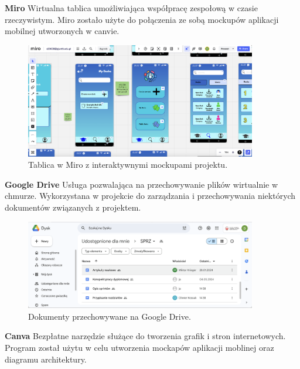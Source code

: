 \textbf{Miro} Wirtualna tablica umożliwiająca współpracę zespołową w czasie rzeczywistym. Miro zostało użyte do połączenia ze sobą mockupów aplikacji mobilnej utworzonych w canvie.

\begin{figure}[H]
    \centering
    \includegraphics[width=0.9\textwidth]{chapters/chapter_7/miro}
    \caption{Tablica w Miro z interaktywnymi mockupami projektu.}
    \label{img:miro}
\end{figure}


\textbf{Google Drive} Usługa pozwalająca na przechowywanie plików wirtualnie w chmurze. Wykorzystana w projekcie do zarządzania i przechowywania niektórych dokumentów związanych z projektem.

\begin{figure}[H]
    \centering
    \includegraphics[width=0.9\textwidth]{chapters/chapter_7/google_drive}
    \caption{Dokumenty przechowywane na Google Drive.}
    \label{img:google_drive}
\end{figure}


\textbf{Canva} Bezpłatne narzędzie służące do tworzenia grafik i stron internetowych. Program został użytu w celu utworzenia mockapów aplikacji moblinej oraz diagramu architektury.

